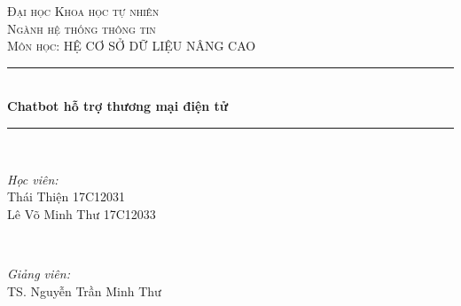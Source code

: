 \begin{titlepage}

\newcommand{\HRule}{\rule{\linewidth}{0.5mm}} %

\center %
 

\textsc{\LARGE Đại học Khoa học tự nhiên}\\[1.5cm] %
\textsc{\Large Ngành hệ thống thông tin}\\[0.5cm] %
\textsc{\large Môn học: HỆ CƠ SỞ DỮ LIỆU NÂNG CAO }\\[0.5cm] %


\HRule \\[0.4cm]
{ \huge \bfseries 
Chatbot hỗ trợ thương mại điện tử
}\\[0.4cm] %
\HRule \\[1.5cm]
 

\begin{minipage}{0.5 \textwidth}
\begin{flushleft} \large
\emph{Học viên:}\\
Thái Thiện 17C12031 \\ %
Lê Võ Minh Thư 17C12033
\end{flushleft}
\end{minipage}
~
\begin{minipage}{0.45 \textwidth}
\begin{flushright} \large
\emph{Giảng viên:} \\
TS. Nguyễn Trần Minh Thư %
\end{flushright}
\end{minipage}\\[1cm]


\end{titlepage}
